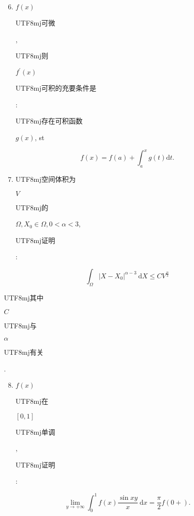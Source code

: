 \documentclass[10pt]{article}
\begin{document}
\begin{enumerate}
  \setcounter{enumi}{5}
  \item $f(x)$ \begin{CJK}{UTF8}{mj}可微\end{CJK}, \begin{CJK}{UTF8}{mj}则\end{CJK} $f^{\prime}(x)$ \begin{CJK}{UTF8}{mj}可积的充要条件是\end{CJK}: \begin{CJK}{UTF8}{mj}存在可积函数\end{CJK} $g(x)$, st
\end{enumerate}
$$
f(x)=f(a)+\int_{a}^{x} g(t) \mathrm{d} t .
$$

\begin{enumerate}
  \setcounter{enumi}{6}
  \item \begin{CJK}{UTF8}{mj}空间体积为\end{CJK} $V$ \begin{CJK}{UTF8}{mj}的\end{CJK} $\Omega, X_{0} \in \Omega, 0<\alpha<3$, \begin{CJK}{UTF8}{mj}证明\end{CJK}:
\end{enumerate}
$$
\int_{\Omega}\left|X-X_{0}\right|^{\alpha-3} \mathrm{~d} X \leqslant C V^{\frac{\alpha}{3}}
$$
\begin{CJK}{UTF8}{mj}其中\end{CJK} $C$ \begin{CJK}{UTF8}{mj}与\end{CJK} $\alpha$ \begin{CJK}{UTF8}{mj}有关\end{CJK}.

\begin{enumerate}
  \setcounter{enumi}{7}
  \item $f(x)$ \begin{CJK}{UTF8}{mj}在\end{CJK} $[0,1]$ \begin{CJK}{UTF8}{mj}单调\end{CJK}, \begin{CJK}{UTF8}{mj}证明\end{CJK}:
\end{enumerate}
$$
\lim _{y \rightarrow+\infty} \int_{0}^{1} f(x) \frac{\sin x y}{x} \mathrm{~d} x=\frac{\pi}{2} f(0+) .
$$
\end{document}
